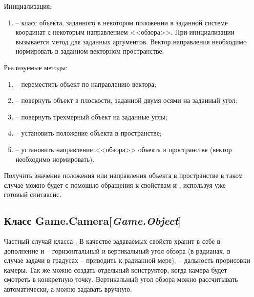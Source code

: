	\noindent Инициализация:
	\begin{enumerate}
		\item {} -- класс объекта, заданного в некотором положении в заданной системе координат с некоторым направлением <<обзора>>. При инициализации вызывается метод  для заданных аргументов. Вектор направления необходимо нормировать в заданном векторном пространстве.
	\end{enumerate}

	\noindent Реализуемые методы:
	\begin{enumerate}
		\item {} -- переместить объект по направлению вектора;
		\item {} -- повернуть объект в плоскости, заданной двумя осями на заданный угол;
		\item {} -- повернуть трехмерный объект на заданные углы;
		\item {} -- установить положение объекта в пространстве;
		\item {} -- установить направление <<обзора>> объекта в пространстве (вектор необходимо нормировать).
	\end{enumerate}

	Получить значение положения или направления объекта в пространстве в таком случае можно будет с помощью обращения к свойствам  и , используя уже готовый синтаксис.


\subsection{Класс Game.Camera[\textit{Game.Object}]}
	\noindent Частный случай класса . В качестве задаваемых свойств хранит в себе в дополнение  и  -- горизонтальный и вертикальный угол обзора (в радианах, в случае задачи в градусах -- приводить к радианной мере),  -- дальность прорисовки камеры. Так же можно создать отдельный конструктор, когда камера будет смотреть в конкретную точку. Вертикальный угол обзора можно рассчитывать автоматически, а можно задавать вручную.

